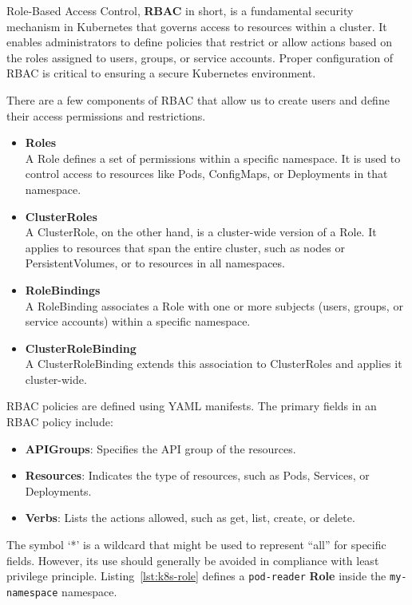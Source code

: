 Role-Based Access Control, \textbf{RBAC} in short, is a fundamental security mechanism in Kubernetes that governs access to resources within a cluster. It enables administrators to define policies that restrict or allow actions based on the roles assigned to users, groups, or service accounts. Proper configuration of RBAC is critical to ensuring a secure Kubernetes environment.

There are a few components of RBAC that allow us to create users and define their access permissions and restrictions.

\begin{itemize}
    \item \textbf{Roles} \\
    A Role defines a set of permissions within a specific namespace. It is used to control access to resources like Pods, ConfigMaps, or Deployments in that namespace.
    \item \textbf{ClusterRoles} \\
    A ClusterRole, on the other hand, is a cluster-wide version of a Role. It applies to resources that span the entire cluster, such as nodes or PersistentVolumes, or to resources in all namespaces.
    \item \textbf{RoleBindings} \\
    A RoleBinding associates a Role with one or more subjects (users, groups, or service accounts) within a specific namespace.
    \item \textbf{ClusterRoleBinding} \\
    A ClusterRoleBinding extends this association to ClusterRoles and applies it cluster-wide.
\end{itemize}

RBAC policies are defined using YAML manifests. The primary fields in an RBAC policy include:

\begin{itemize}[noitemsep]
    \item \textbf{APIGroups}: Specifies the API group of the resources.
    \item \textbf{Resources}: Indicates the type of resources, such as Pods, Services, or Deployments.
    \item \textbf{Verbs}: Lists the actions allowed, such as get, list, create, or delete.
\end{itemize}

The symbol `*' is a wildcard that might be used to represent ``all'' for specific fields. However, its use should generally be avoided in compliance with least privilege principle.
Listing~\ref{lst:k8s-role} defines a \lstinline{pod-reader} \textbf{Role} inside the \lstinline{my-namespace} namespace.

